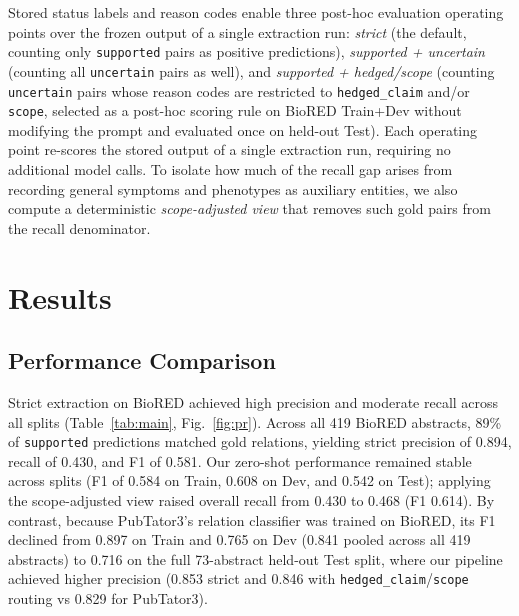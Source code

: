 \documentclass[preprint,10pt,letterpaper]{elsarticle}
\newcommand{\st}[1]{\texttt{#1}}             %
\begin{document}
Stored status labels and reason codes enable three post-hoc evaluation operating points over the frozen output of a single extraction run: \emph{strict} (the default, counting only \st{supported} pairs as positive predictions), \emph{supported + uncertain} (counting all \st{uncertain} pairs as well), and \emph{supported + hedged/scope} (counting \st{uncertain} pairs whose reason codes are restricted to \st{hedged\_claim} and/or \st{scope}, selected as a post-hoc scoring rule on BioRED Train+Dev without modifying the prompt and evaluated once on held-out Test). Each operating point re-scores the stored output of a single extraction run, requiring no additional model calls. To isolate how much of the recall gap arises from recording general symptoms and phenotypes as auxiliary entities, we also compute a deterministic \emph{scope-adjusted view} that removes such gold pairs from the recall denominator.

\section{Results}

\subsection{Performance Comparison}
Strict extraction on BioRED achieved high precision and moderate recall across all splits (Table~\ref{tab:main}, Fig.~\ref{fig:pr}). Across all 419 BioRED abstracts, 89\% of \st{supported} predictions matched gold relations, yielding strict precision of 0.894, recall of 0.430, and F1 of 0.581. Our zero-shot performance remained stable across splits (F1 of 0.584 on Train, 0.608 on Dev, and 0.542 on Test); applying the scope-adjusted view raised overall recall from 0.430 to 0.468 (F1 0.614). By contrast, because PubTator3's relation classifier was trained on BioRED, its F1 declined from 0.897 on Train and 0.765 on Dev (0.841 pooled across all 419 abstracts) to 0.716 on the full 73-abstract held-out Test split, where our pipeline achieved higher precision (0.853 strict and 0.846 with \st{hedged\_claim}/\st{scope} routing vs 0.829 for PubTator3).
\end{document}
